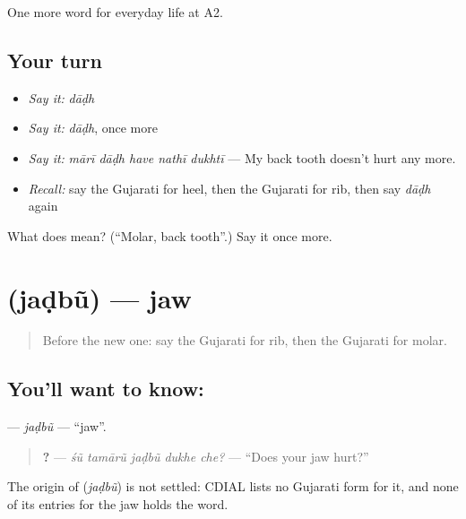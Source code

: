 \begin{grammarlens}[title={What you've built}]
One more word for everyday life at A2.
\end{grammarlens}

\subsection*{Your turn}
\begin{itemize}
\raggedright
  \item \emph{Say it:} \emph{dāḍh}
  \item \emph{Say it:} \emph{dāḍh}, once more
  \item \emph{Say it:} \emph{mārī dāḍh have nathī dukhtī} — My back tooth doesn't hurt any more.
  \item \emph{Recall:} say the Gujarati for heel, then the Gujarati for rib, then say \emph{dāḍh} again
\end{itemize}

\begin{tcolorbox}[breakable,colback=teal!4,colframe=teal!35!black,title={Before you move on}]
What does  mean? (\textquotedblleft{}Molar, back tooth\textquotedblright{}.) Say it once more.
\end{tcolorbox}
\section[\texorpdfstring{\gu{જડબું} (jaḍbũ)}{જડબું (jaḍbũ)}]{ (jaḍbũ) — jaw}

\label{lesson:GU-C230-jadbu}



\begin{quote}
Before the new one: say the Gujarati for rib, then the Gujarati for molar.
\end{quote}

\subsection*{You'll want to know: }
\textbf{} — \emph{jaḍbũ} — \textquotedblleft{}jaw\textquotedblright{}.

\begin{quote}
\textbf{    ?} — \emph{śũ tamārũ jaḍbũ dukhe che?} — \textquotedblleft{}Does your jaw hurt?\textquotedblright{}
\end{quote}

\begin{cousinweb}
The origin of \textbf{} (\emph{jaḍbũ}) is not settled: CDIAL lists no Gujarati form for it, and none of its entries for the jaw holds the word.
\end{cousinweb}

